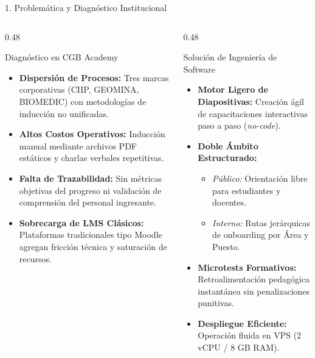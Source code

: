 \documentclass[aspectratio=169, 10pt, spanish]{beamer}
\begin{document}
\begin{frame}{1. Problemática y Diagnóstico Institucional}
\begin{columns}[T]
    \begin{column}{0.48\textwidth}
        \begin{academicbox}{Diagnóstico en CGB Academy}
            \scriptsize
            \begin{itemize}
                \item \textbf{Dispersión de Procesos:} Tres marcas corporativas (CIIP, GEOMINA, BIOMEDIC) con metodologías de inducción no unificadas.
                \item \textbf{Altos Costos Operativos:} Inducción manual mediante archivos PDF estáticos y charlas verbales repetitivas.
                \item \textbf{Falta de Trazabilidad:} Sin métricas objetivas del progreso ni validación de comprensión del personal ingresante.
                \item \textbf{Sobrecarga de LMS Clásicos:} Plataformas tradicionales tipo Moodle agregan fricción técnica y saturación de recursos.
            \end{itemize}
        \end{academicbox}
    \end{column}
    \begin{column}{0.48\textwidth}
        \begin{formalbox}{Solución de Ingeniería de Software}
            \scriptsize
            \begin{itemize}
                \item \textbf{Motor Ligero de Diapositivas:} Creación ágil de capacitaciones interactivas paso a paso (\textit{no-code}).
                \item \textbf{Doble Ámbito Estructurado:}
                \begin{itemize}
                    \item \textit{Público:} Orientación libre para estudiantes y docentes.
                    \item \textit{Interno:} Rutas jerárquicas de onboarding por Área y Puesto.
                \end{itemize}
                \item \textbf{Microtests Formativos:} Retroalimentación pedagógica instantánea sin penalizaciones punitivas.
                \item \textbf{Despliegue Eficiente:} Operación fluida en VPS (2 vCPU / 8 GB RAM).
            \end{itemize}
        \end{formalbox}
    \end{column}
\end{columns}
\end{frame}
\end{document}
